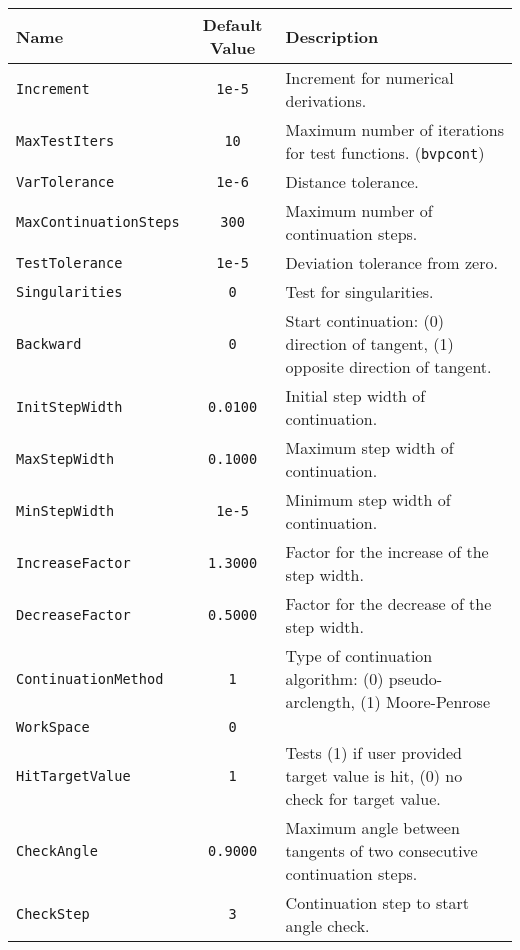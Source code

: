 \begin{tabularx}{\linewidth}{|l|c|X|}\hline
\textbf{Name} & \textbf{Default Value} & \textbf{Description}\\\hline
\lstinline+Increment+ & \lstinline+1e-5+ & Increment for numerical derivations.\\ 
\lstinline+MaxTestIters+ & \lstinline+10+ & Maximum number of iterations for test functions. (\lstinline+bvpcont+)\\ 
\lstinline+VarTolerance+ & \lstinline+1e-6+ & Distance tolerance. \\ 
\lstinline+MaxContinuationSteps+ & \lstinline+300+ &  Maximum number of continuation steps.\\ 
\lstinline+TestTolerance+ & \lstinline+1e-5+ & Deviation tolerance from zero.\\ 
\lstinline+Singularities+ & \lstinline+0+ & Test for singularities.\\ 
\lstinline+Backward+ & \lstinline+0+ & Start continuation: (0) direction of tangent, (1) opposite direction of tangent.\\ 
\lstinline+InitStepWidth+ & \lstinline+0.0100+ & Initial step width of continuation.\\ 
\lstinline+MaxStepWidth+ & \lstinline+0.1000+ & Maximum step width of continuation. \\ 
\lstinline+MinStepWidth+ & \lstinline+1e-5+ &  Minimum step width of continuation.\\ 
\lstinline+IncreaseFactor+ & \lstinline+1.3000+ & Factor for the increase of the step width.\\ 
\lstinline+DecreaseFactor+ & \lstinline+0.5000+ & Factor for the decrease of the step width. \\ 
\lstinline+ContinuationMethod+ & \lstinline+1+ &  Type of continuation algorithm: (0) pseudo-arclength, (1) Moore-Penrose\\ 
\lstinline+WorkSpace+ & \lstinline+0+ & \\ 
\lstinline+HitTargetValue+ & \lstinline+1+ & Tests (1) if user provided target value is hit, (0) no check for target value.\\ 
\lstinline+CheckAngle+ & \lstinline+0.9000+ & Maximum angle between tangents of two consecutive continuation steps.\\ 
\lstinline+CheckStep+ & \lstinline+3+ & Continuation step to start angle check. \\ 

\end{tabularx}
